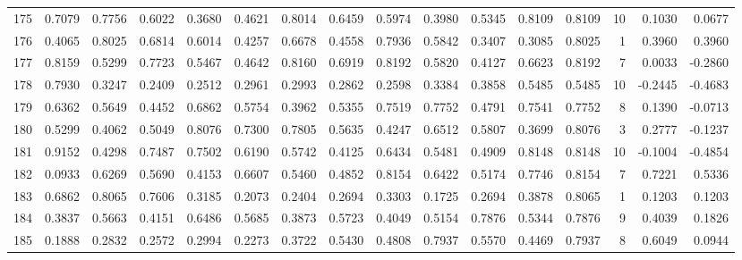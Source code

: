 \begin{tabular}{lrrrrrrrrrrrrrrr}
175 &      0.7079 &  0.7756 &  0.6022 &  0.3680 &  0.4621 &  0.8014 &  0.6459 &  0.5974 &  0.3980 &  0.5345 &   0.8109 &     0.8109 &     10 &                    0.1030 &                     0.0677 \\
176 &      0.4065 &  0.8025 &  0.6814 &  0.6014 &  0.4257 &  0.6678 &  0.4558 &  0.7936 &  0.5842 &  0.3407 &   0.3085 &     0.8025 &      1 &                    0.3960 &                     0.3960 \\
177 &      0.8159 &  0.5299 &  0.7723 &  0.5467 &  0.4642 &  0.8160 &  0.6919 &  0.8192 &  0.5820 &  0.4127 &   0.6623 &     0.8192 &      7 &                    0.0033 &                    -0.2860 \\
178 &      0.7930 &  0.3247 &  0.2409 &  0.2512 &  0.2961 &  0.2993 &  0.2862 &  0.2598 &  0.3384 &  0.3858 &   0.5485 &     0.5485 &     10 &                   -0.2445 &                    -0.4683 \\
179 &      0.6362 &  0.5649 &  0.4452 &  0.6862 &  0.5754 &  0.3962 &  0.5355 &  0.7519 &  0.7752 &  0.4791 &   0.7541 &     0.7752 &      8 &                    0.1390 &                    -0.0713 \\
180 &      0.5299 &  0.4062 &  0.5049 &  0.8076 &  0.7300 &  0.7805 &  0.5635 &  0.4247 &  0.6512 &  0.5807 &   0.3699 &     0.8076 &      3 &                    0.2777 &                    -0.1237 \\
181 &      0.9152 &  0.4298 &  0.7487 &  0.7502 &  0.6190 &  0.5742 &  0.4125 &  0.6434 &  0.5481 &  0.4909 &   0.8148 &     0.8148 &     10 &                   -0.1004 &                    -0.4854 \\
182 &      0.0933 &  0.6269 &  0.5690 &  0.4153 &  0.6607 &  0.5460 &  0.4852 &  0.8154 &  0.6422 &  0.5174 &   0.7746 &     0.8154 &      7 &                    0.7221 &                     0.5336 \\
183 &      0.6862 &  0.8065 &  0.7606 &  0.3185 &  0.2073 &  0.2404 &  0.2694 &  0.3303 &  0.1725 &  0.2694 &   0.3878 &     0.8065 &      1 &                    0.1203 &                     0.1203 \\
184 &      0.3837 &  0.5663 &  0.4151 &  0.6486 &  0.5685 &  0.3873 &  0.5723 &  0.4049 &  0.5154 &  0.7876 &   0.5344 &     0.7876 &      9 &                    0.4039 &                     0.1826 \\
185 &      0.1888 &  0.2832 &  0.2572 &  0.2994 &  0.2273 &  0.3722 &  0.5430 &  0.4808 &  0.7937 &  0.5570 &   0.4469 &     0.7937 &      8 &                    0.6049 &                     0.0944 \\

\end{tabular}

